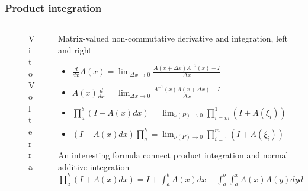 \documentclass[aspectratio=169]{beamer}
\begin{document}
\begin{frame}
    \frametitle{Product integration}
    \begin{columns}
            \begin{column}{0.3\textwidth}
                \begin{figure}[ht]\centering
                \caption{Vito Volterra}
                \end{figure}
            \end{column}
            \begin{column}{0.7\textwidth}
            Matrix-valued non-commutative derivative and integration, left and right
            \begin{itemize}
                \item $\frac{d}{dx} A(x) = \lim_{\Delta x \to 0} \frac{A(x + \Delta x) A^{-1}(x) - I}{\Delta x}$
                \item $A(x) \frac{d}{dx} = \lim_{\Delta x \to 0} \frac{A^{-1}(x) A(x + \Delta x) - I}{\Delta x}$
                \item $\prod_{a}^{b} (I + A(x) dx) = \lim_{\nu(P) \to 0} \prod_{i=m}^{1}(I + A(\xi_i))$
                \item $(I + A(x) dx) \prod_{a}^{b}  = \lim_{\nu(P) \to 0} \prod_{i=1}^{m}(I + A(\xi_i))$
            \end{itemize}
            An interesting formula connect product integration and normal additive integration
            $\prod_a^b (I + A(x) dx) = I + \int_a^b A(x) dx + \int_a^b \int_a^x A(x) A(y) dy dx + \cdots$
            \end{column}
    \end{columns}
\end{frame}
\end{document}
